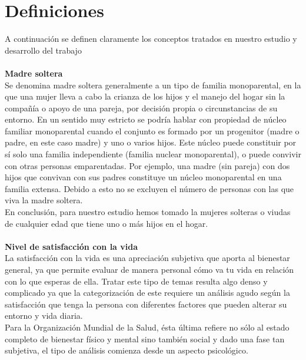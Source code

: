 \documentclass[11pt,twoside]{article}
\begin{document}
\section{Definiciones}
\noindent
A continuación se definen claramente los conceptos tratados en nuestro estudio y desarrollo del trabajo \\
\\
\textbf{Madre soltera} \\
Se denomina madre soltera generalmente a un tipo de familia monoparental, en la que una mujer lleva a cabo la crianza de los hijos y el manejo del hogar sin la compañía o apoyo de una pareja, por decisión propia o circunstancias de su entorno. En un sentido muy estricto se podría hablar con propiedad de núcleo familiar monoparental cuando el conjunto es formado por un progenitor (madre o padre, en este caso madre) y uno o varios hijos. Este núcleo puede constituir por sí solo una familia independiente (familia nuclear monoparental), o puede convivir con otras personas emparentadas. Por ejemplo, una madre (sin pareja) con dos hijos que convivan con sus padres constituye un núcleo monoparental en una familia extensa. Debido a esto no se excluyen el número de personas con las que viva la madre soltera.\\
En conclusión, para nuestro estudio hemos tomado la mujeres solteras o viudas de cualquier edad que tiene uno o más hijos en el hogar.\\
\\
\textbf{Nivel de satisfacción con la vida}\\
La satisfacción con la vida es una apreciación subjetiva que aporta al bienestar general, ya que permite evaluar de manera personal cómo va tu vida en relación con lo que esperas de ella. Tratar este tipo de temas resulta algo denso y complicado ya que la categorización de este requiere un análisis agudo según la satisfacción que tenga la persona con diferentes factores que pueden alterar su entorno y vida diaria.\\
Para la Organización Mundial de la Salud, ésta última refiere no sólo al estado completo de bienestar físico y mental sino también social y dado una fase tan subjetiva, el tipo de análisis comienza desde un aspecto psicológico.




\end{document}
